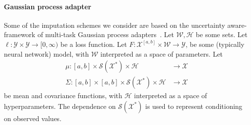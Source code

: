 \documentclass{article}
\renewcommand{\subsubsection}[1]{\textbf{#1}

} %
\newcommand{\dataspace}{\mathcal{X}}
\newcommand{\lspace}{\mathcal{Y}}
\newcommand{\seriesspace}{\mathcal{S}}
\begin{document}

\paragraph{Gaussian process adapter} \label{sec: GPadapter}
%
Some of the imputation schemes we consider are based on
the uncertainty aware-framework of multi-task Gaussian process
adapters~\citep{li2016scalable, futoma2017mgp}.
%
Let $\mathcal{W}, \mathcal{H}$ be some sets. Let $\ell \colon \lspace
\times \lspace \to [0, \infty)$ be a loss function. Let $F \colon
\dataspace^{[a, b]} \times \mathcal{W} \to \lspace$, be some (typically
neural network) model, with $\mathcal{W}$ interpreted as a space of
parameters. Let \begin{align*} \mu \colon [a, b] \times
\seriesspace(\dataspace^*) \times \mathcal{H} &\to \dataspace\\ \Sigma
\colon [a, b] \times [a, b] \times \seriesspace(\dataspace^*) \times
\mathcal{H} &\to \dataspace    \end{align*} be mean and covariance
functions, with $\mathcal{H}$ interpreted as a space of
hyperparameters. The dependence on $\seriesspace(\dataspace^*)$ is used to
represent conditioning on observed values.
\end{document}
